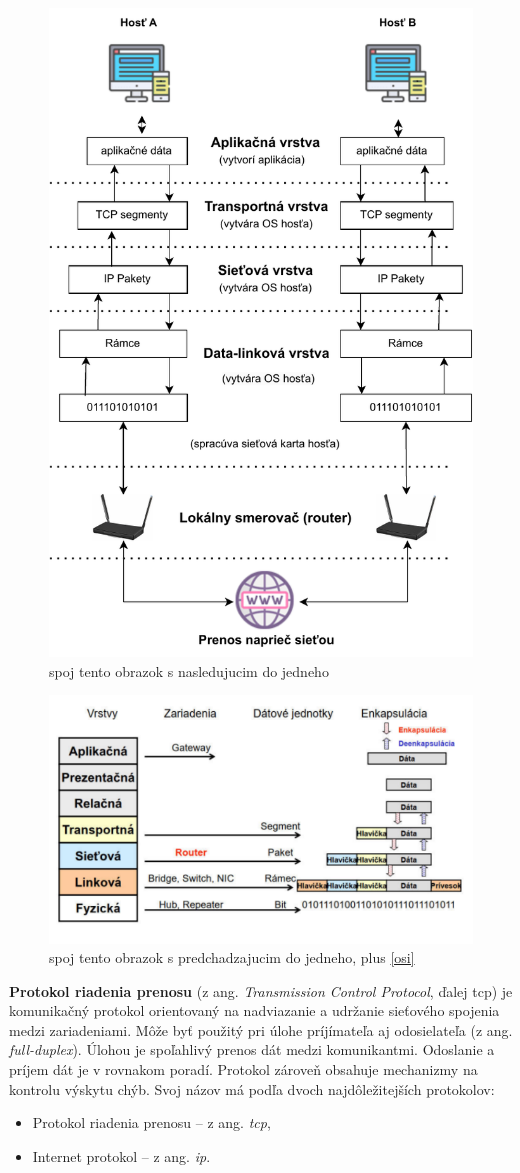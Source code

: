 \begin{figure}[!h]
	\centering
	\includegraphics[width=0.7\linewidth]{figures/prenos1z2}
	\caption{spoj tento obrazok s nasledujucim do jedneho}
	\label{p1}
\end{figure}
\begin{figure}
	\centering
	\includegraphics[width=0.7\linewidth]{figures/prenos2z2}
	\caption{spoj tento obrazok s predchadzajucim do jedneho, plus \ref{osi}}
	\label{p2}
\end{figure}
\newpage
\textbf{Protokol riadenia prenosu} (z ang. \textit{Transmission Control Protocol}, ďalej \acrshort{tcp}) je komunikačný protokol orientovaný na nadviazanie a udržanie sieťového spojenia medzi zariadeniami. Môže byť použitý pri úlohe príjímateľa aj odosielateľa (z ang. \textit{full-duplex}). Úlohou je spoľahlivý prenos dát medzi komunikantmi. Odoslanie a príjem dát je v rovnakom poradí. Protokol zároveň obsahuje mechanizmy na kontrolu výskytu chýb. Svoj názov má podľa dvoch najdôležitejších protokolov:
\begin{itemize}
	\item{Protokol riadenia prenosu} -- z ang. \textit{\acrlong{tcp}},
	\item{Internet protokol} -- z ang. \textit{\acrlong{ip}}. 
\end{itemize}

